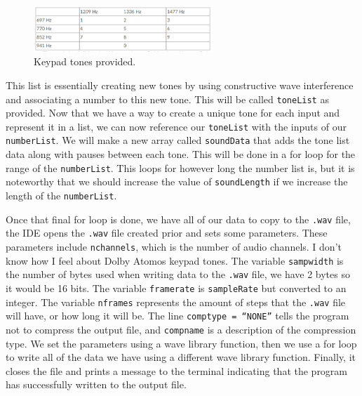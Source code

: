 \documentclass[12pt]{iopart}
\begin{document}
\begin{figure}[h!tbp]
  \begin{center}
 \item[]\includegraphics[width=0.6\textwidth]{images/Capture.PNG}
  \caption{\label{fig: Keypad Tones} 
  Keypad tones provided.
  }
  \end{center}
\end{figure}

This list is essentially creating new tones by using constructive wave interference and associating a number to this new tone. 
This will be called \verb|toneList| as provided. 
Now that we have a way to create a unique tone for each input and represent it in a list, we can now reference our \verb|toneList| with the inputs of our \verb|numberList|. 
We will make a new array called \verb|soundData| that adds the tone list data along with pauses between each tone. 
This will be done in a for loop for the range of the \verb|numberList|. This loops for however long the number list is, but it is noteworthy that we should increase the value of \verb|soundLength| if we increase the length of the \verb|numberList|.

Once that final for loop is done, we have all of our data to copy to the \verb|.wav| file, the IDE opens the \verb|.wav| file created prior and sets some parameters. 
These parameters include \verb|nchannels|, which is the number of audio channels. 
I don’t know how I feel about Dolby Atomos keypad tones. 
The variable \verb|sampwidth| is the number of bytes used when writing data to the \verb|.wav| file, we have 2 bytes so it would be 16 bits. 
The variable \verb|framerate| is \verb|sampleRate| but converted to an integer. The variable \verb|nframes| represents the amount of steps that the \verb|.wav| file will have, or how long it will be. The line \verb|comptype = “NONE”| tells the program not to compress the output file, and \verb|compname| is a description of the compression type. 
We set the parameters using a wave library function, then we use a for loop to write all of the data we have using a different wave library function.
Finally, it closes the file and prints a message to the terminal indicating that the program has successfully written to the output file.

\end{document}

